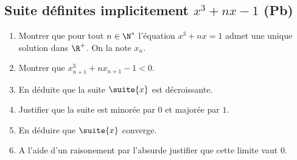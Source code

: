 \subsection{ Suite définites implicitement $x^3+nx-1$ (Pb) }


\begin{exercice}
\begin{enumerate}
\item Montrer que pour tout $n\in \N^*$ l'équation $x^3+nx=1$ admet une unique solution dans $\R^+$. On la note $x_n$. 
\item Montrer que $x_{n+1}^3+n x_{n+1}-1<0$.
\item En déduite que la suite $\suite{x} $ est décroissante. 
\item Justifier que la suite est minorée par $0$ et majorée par $1$. 
\item En déduire que $\suite{x}$ converge. 
\item A l'aide d'un raisonement par l'absurde justifier que cette limite vaut $0$. 
\end{enumerate}
\end{exercice}

